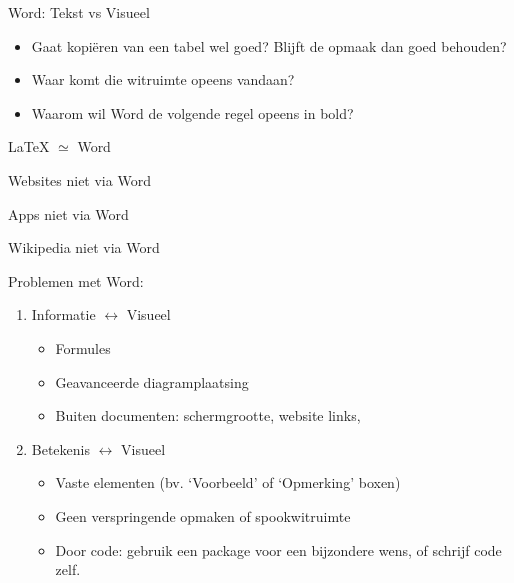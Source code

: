 \documentclass[handout]{beamer}
\begin{document}
\begin{frame}
	Word: Tekst vs Visueel
	
	\begin{itemize}
		\item Gaat kopiëren van een tabel wel goed? Blijft de opmaak dan goed behouden?
		\item Waar komt die witruimte opeens vandaan?
		\item Waarom wil Word de volgende regel opeens in bold?
	\end{itemize}

\end{frame}

\begin{frame}
	\LaTeX{} $ \simeq $ Word
\end{frame}

\begin{frame}
	Websites niet via Word
\end{frame}

\begin{frame}
	Apps niet via Word
\end{frame}

\begin{frame}
	Wikipedia niet via Word
\end{frame}

\begin{frame}[<+->]
	Problemen met Word:
	\begin{enumerate}
		\item Informatie $\leftrightarrow$ Visueel
			\begin{itemize}
				\item Formules
				\item Geavanceerde diagramplaatsing
				\item Buiten documenten: schermgrootte, website links, \textellipsis
			\end{itemize}
		\item Betekenis $ \leftrightarrow $ Visueel
			\begin{itemize}
				\item Vaste elementen (bv. `Voorbeeld' of `Opmerking' boxen)
				\item Geen verspringende opmaken of spookwitruimte
				\item Door code: gebruik een package voor een bijzondere wens, of schrijf code zelf.
			\end{itemize}
	\end{enumerate}
\end{frame}
\end{document}

